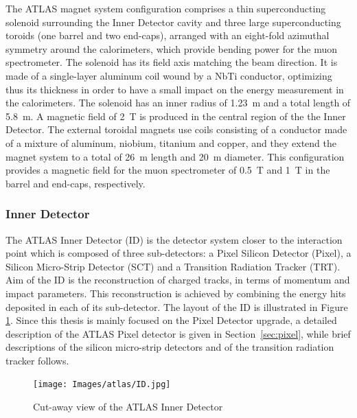 The ATLAS magnet system\cite{atlas_magnet} configuration comprises a thin superconducting solenoid surrounding the Inner Detector cavity and three large superconducting toroids (one barrel and two end-caps), arranged with an eight-fold azimuthal symmetry around the calorimeters, which provide bending power for the muon spectrometer.
%
The solenoid has its field axis matching the beam direction. It is made of a single-layer aluminum coil wound by a NbTi conductor, optimizing thus its thickness in order to have a small impact on the energy measurement in the calorimeters. The solenoid has an inner radius of \SI{1.23}{\meter} and a total length of \SI{5.8}{\meter}. A magnetic field of \SI{2}{\tesla} is produced in the central region of the the Inner Detector.
The external toroidal magnets use coils consisting of a conductor made of a mixture of aluminum, niobium, titanium and copper, and they extend the magnet system to a total of \SI{26}{\meter} length and \SI{20}{\meter} diameter. This configuration provides a magnetic field for the muon spectrometer of \SI{0.5}{\tesla} and \SI{1}{\tesla} in the barrel and end-caps, respectively. %


\subsubsection{Inner Detector}
The ATLAS Inner Detector\cite{atlas_id1,atlas_id2} (ID) is the detector system closer to the interaction point which is composed of three sub-detectors: a Pixel Silicon Detector (Pixel), a Silicon Micro-Strip Detector (SCT) and a Transition Radiation Tracker (TRT).
Aim of the ID is the reconstruction of charged tracks, in terms of momentum and impact parameters. This reconstruction is achieved by combining the energy hits deposited in each of its sub-detector. The layout of the ID is illustrated in Figure \ref{pic:id}.
Since this thesis is mainly focused on the Pixel Detector upgrade, a detailed description of the ATLAS Pixel detector is given in Section~\ref{sec:pixel}, while brief descriptions of the silicon micro-strip detectors and of the transition radiation tracker follows.
\begin{figure}
\center
\texttt{[image: Images/atlas/ID.jpg]}
\caption{Cut-away view of the ATLAS Inner Detector}
\label{pic:id}
\end{figure}

